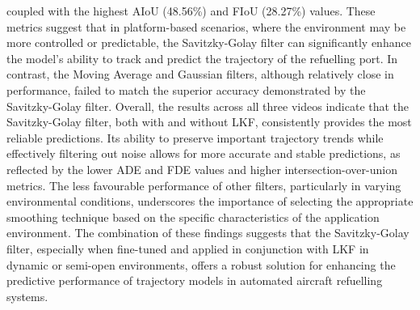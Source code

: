 \documentclass[12pt,oneside]{book} %
\begin{document}
coupled with the highest AIoU (48.56\%) and FIoU (28.27\%) values. These
metrics suggest that in platform-based scenarios, where the environment may be
more controlled or predictable, the Savitzky-Golay filter can significantly
enhance the model's ability to track and predict the trajectory of the
refuelling port. In contrast, the Moving Average and Gaussian filters, although
relatively close in performance, failed to match the superior accuracy
demonstrated by the Savitzky-Golay filter. Overall, the results across all
three videos indicate that the Savitzky-Golay filter, both with and without
LKF, consistently provides the most reliable predictions. Its ability to
preserve important trajectory trends while effectively filtering out noise
allows for more accurate and stable predictions, as reflected by the lower ADE
and FDE values and higher intersection-over-union metrics. The less favourable
performance of other filters, particularly in varying environmental conditions,
underscores the importance of selecting the appropriate smoothing technique
based on the specific characteristics of the application environment. The
combination of these findings suggests that the Savitzky-Golay filter,
especially when fine-tuned and applied in conjunction with LKF in dynamic or
semi-open environments, offers a robust solution for enhancing the predictive
performance of trajectory models in automated aircraft refuelling systems.
\end{document}
